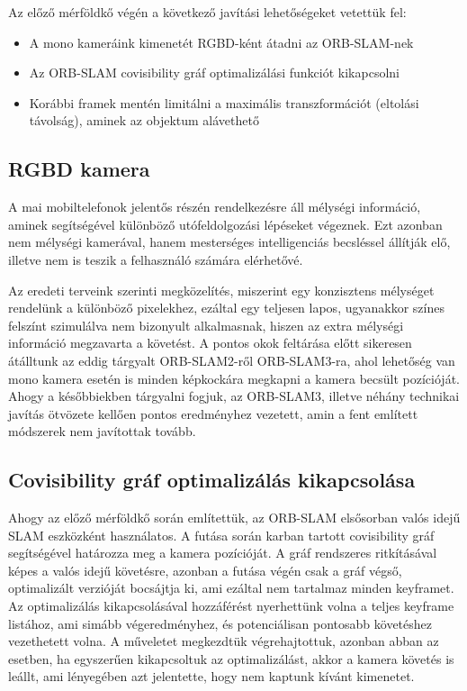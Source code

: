 Az előző mérföldkő végén a következő javítási lehetőségeket vetettük fel:
\begin{itemize}
	\item A mono kameráink kimenetét RGBD-ként átadni az ORB-SLAM-nek
	\item Az ORB-SLAM covisibility gráf optimalizálási funkciót kikapcsolni
	\item Korábbi framek mentén limitálni a maximális transzformációt (eltolási távolság), aminek az objektum alávethető
\end{itemize}

\subsection{RGBD kamera}

A mai mobiltelefonok jelentős részén rendelkezésre áll mélységi információ, aminek segítségével különböző utófeldolgozási lépéseket végeznek.
Ezt azonban nem mélységi kamerával, hanem mesterséges intelligenciás becsléssel állítják elő, illetve nem is teszik a felhasználó számára elérhetővé.

Az eredeti terveink szerinti megközelítés, miszerint egy konzisztens mélységet rendelünk a különböző pixelekhez, ezáltal egy teljesen lapos, ugyanakkor színes felszínt szimulálva nem bizonyult alkalmasnak, hiszen az extra mélységi információ megzavarta a követést.
A pontos okok feltárása előtt sikeresen átálltunk az eddig tárgyalt ORB-SLAM2-ről ORB-SLAM3-ra, ahol lehetőség van mono kamera esetén is minden képkockára megkapni a kamera becsült pozícióját.
Ahogy a későbbiekben tárgyalni fogjuk, az ORB-SLAM3, illetve néhány technikai javítás ötvözete kellően pontos eredményhez vezetett, amin a fent említett módszerek nem javítottak tovább.

\subsection{Covisibility gráf optimalizálás kikapcsolása}

Ahogy az előző mérföldkő során említettük, az ORB-SLAM elsősorban valós idejű SLAM eszközként használatos.
A futása során karban tartott covisibility gráf segítségével határozza meg a kamera pozícióját.
A gráf rendszeres ritkításával képes a valós idejű követésre, azonban a futása végén csak a gráf végső, optimalizált verzióját bocsájtja ki, ami ezáltal nem tartalmaz minden keyframet.
Az optimalizálás kikapcsolásával hozzáférést nyerhettünk volna a teljes keyframe listához, ami simább végeredményhez, és potenciálisan pontosabb követéshez vezethetett volna.
A műveletet megkezdtük végrehajtottuk, azonban abban az esetben, ha egyszerűen kikapcsoltuk az optimalizálást, akkor a kamera követés is leállt, ami lényegében azt jelentette, hogy nem kaptunk kívánt kimenetet.

